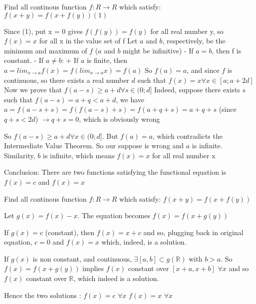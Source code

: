 \begin{solution}
	\begin{tcolorbox}Find all continous function $ f: R\to R$ which satisfy:
$ f(x + y) = f(x + f(y)) (1)$\end{tcolorbox}

Since (1), put x = 0 gives $ f(f(y)) = f(y)$ for all real number y, so $ f(x) = x$ for all x in the value set of f
Let $ a$ and $ b$, respectively, be the minimum and maximum of $ f$ ($ a$ and $ b$ might be infinitive)
- If $ a = b$, then f is constant.
- If $ a \neq b$:
  + If $ a$ is finite, then $ a = lim_{x \rightarrow a} f(x) = f(lim_{x \rightarrow a} x) = f(a)$
So $ f(a) = a$, and since $ f$ is continuous, so there exists a real number $ d$ such that
$ f(x) = x \forall x \in [a; a + 2d]$
Now we prove that $ f(a - s) \ge a + d \forall s \in (0;d]$
Indeed, suppose there exists $ s$ such that $ f(a - s) = a + q < a + d$, we have
$ a = f(a - s + s) = f(f(a - s) + s) = f(a + q + s) = a + q + s$ (since $ q + s < 2d$)
$ \rightarrow q + s = 0$, which is obviously wrong

So $ f(a - s) \ge a + d \forall x \in (0; d]$. But $ f(a) = a$, which contradicts the Intermediate Value Theorem. So our suppose is wrong and $ a$ is infinite. Similarity, $ b$ is infinite, which means $ f(x) = x$ for all real number x

Conclusion:
There are two functions satisfying the functional equation is $ f(x) = c$ and $ f(x) = x$
\end{solution}



\begin{solution}
	\begin{tcolorbox}Find all continous function $ f: R\to R$ which satisfy:
$ f(x + y) = f(x + f(y))$\end{tcolorbox}

Let $ g(x)=f(x)-x$. The equation becomes $ f(x)=f(x+g(y))$

If $ g(x)=c$ (constant), then $ f(x)=x+c$ and so, plugging back in original equation, $ c=0$ and $ f(x)=x$ which, indeed, is a solution.

If $ g(x)$ is non constant, and continuous, $ \exists [a,b]\subset g(\mathbb R)$ with $ b>a$. So $ f(x)=f(x+g(y))$ implies $ f(x)$ constant over $ [x+a,x+b]$ $ \forall x$ and so $ f(x)$ constant over $ \mathbb R$, which indeed is a solution.

Hence the two solutions :
$ f(x)=c$ $ \forall x$
$ f(x)=x$ $ \forall x$
\end{solution}



